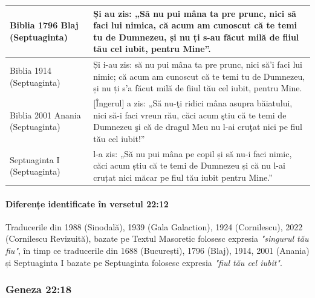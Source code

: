 \documentclass[12pt,a4paper]{article}
\begin{document}
\begin{longtable}{|p{3cm}|L|}
    \hline
    Biblia 1796 Blaj (Septuaginta)               & Și au zis: „Să nu pui mâna ta pre prunc, nici să faci lui nimica, că acum am cunoscut că te temi tu de Dumnezeu, și nu ți s-au făcut milă de fiiul tău cel iubit, pentru Mine”.             \\
    \hline
    Biblia 1914 (Septuaginta)                    & Și i-au zis: să nu pui mâna ta pre prunc, nici să'i faci lui nimic; că acum am cunoscut că te temi tu de Dumnezeu, și nu ți s'a făcut milă de fiiul tău cel iubit, pentru Mine.             \\
    \hline
    Biblia 2001 Anania (Septuaginta)             & [Îngerul] a zis: „Să nu-ţi ridici mâna asupra băiatului, nici să-i faci vreun rău, căci acum ştiu că te temi de Dumnezeu şi că de dragul Meu nu l-ai cruţat nici pe fiul tău cel iubit!”    \\
    \hline
    Septuaginta I (Septuaginta)                  & l-a zis: „Să nu pui mâna pe copil și să nu-i faci nimic, căci acum știu că te temi de Dumnezeu și că nu l-ai cruțat nici măcar pe fiul tău iubit pentru Mine.”                              \\
    \hline
\end{longtable}

\paragraph{Diferențe identificate în versetul 22:12}
Traducerile din 1988 (Sinodală), 1939 (Gala Galaction), 1924 (Cornilescu), 2022 (Cornilescu Revizuită), bazate pe Textul Masoretic folosesc expresia \emph{"singurul tău fiu"}, în timp ce traducerile din 1688 (București), 1796 (Blaj), 1914, 2001 (Anania) și Septuaginta I bazate pe Septuaginta folosesc expresia \emph{"fiul tău cel iubit"}.

\subsubsection{Geneza 22:18}
\end{document}
